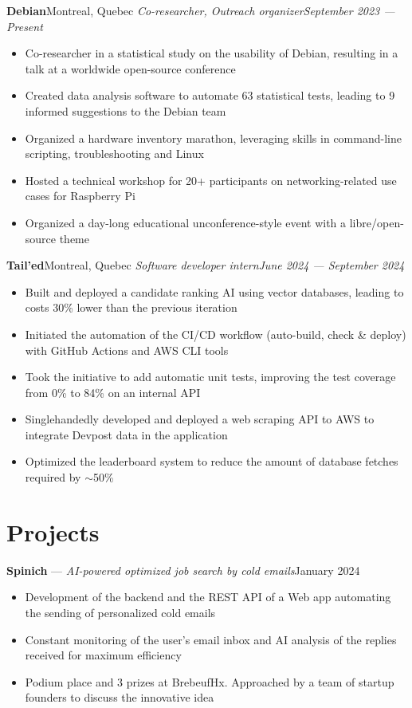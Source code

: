 \documentclass{article}
\newcommand{\newrole}[4]{
    {\normalfont\textbf{#1}\hfill#3}
    \newline
    \textit{#2}\hfill\textit{#4}
}
\newcommand{\shortrole}[3]{
    {\normalfont\textbf{#1} --- \textit{#2}\hfill#3\vspace*{-4pt}}
}
\newenvironment{bulletpoints}{\begin{itemize}\setlength\itemsep{-0.3em}}{\end{itemize}}
\begin{document}
\newrole{Debian}{Co-researcher, Outreach organizer}{Montreal, Quebec}{September 2023 --- Present}
\begin{bulletpoints}
    \item Co-researcher in a statistical study on the usability of Debian, resulting in a talk at a worldwide open-source conference
    \item Created data analysis software to automate 63 statistical tests, leading to 9 informed suggestions to the Debian team
    \item Organized a hardware inventory marathon, leveraging skills in command-line scripting, troubleshooting and Linux
    \item Hosted a technical workshop for 20+ participants on networking-related use cases for Raspberry Pi
    \item Organized a day-long educational unconference-style event with a libre/open-source theme
\end{bulletpoints}

\newrole{Tail'ed}{Software developer intern}{Montreal, Quebec}{June 2024 --- September 2024}
\begin{bulletpoints}
    \item Built and deployed a candidate ranking AI using vector databases, leading to costs 30\% lower than the previous iteration
    \item Initiated the automation of the CI/CD workflow (auto-build, check \& deploy) with GitHub Actions and AWS CLI tools
    \item Took the initiative to add automatic unit tests, improving the test coverage from 0\% to 84\% on an internal API
    \item Singlehandedly developed and deployed a web scraping API to AWS to integrate Devpost data in the application
    \item Optimized the leaderboard system to reduce the amount of database fetches required by $\sim$50\%
\end{bulletpoints}


\section*{Projects}

\shortrole{Spinich}{AI-powered optimized job search by cold emails}{January 2024}
\begin{bulletpoints}
    \item Development of the backend and the REST API of a Web app automating the sending of personalized cold emails
    \item Constant monitoring of the user's email inbox and AI analysis of the replies received for maximum efficiency
    \item Podium place and 3 prizes at BrebeufHx. Approached by a team of startup founders to discuss the innovative idea
\end{bulletpoints}
\end{document}
